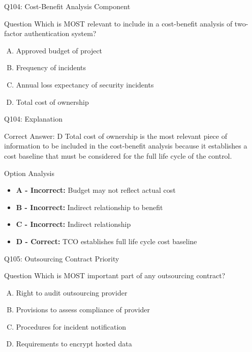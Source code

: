 \documentclass{beamer}
\begin{document}
	\begin{frame}{Q104: Cost-Benefit Analysis Component}
		\begin{block}{Question}
			Which is MOST relevant to include in a cost-benefit analysis of two-factor authentication system?
		\end{block}
		\begin{enumerate}[(A)]
			\item Approved budget of project
			\item Frequency of incidents
			\item Annual loss expectancy of security incidents
			\item Total cost of ownership
		\end{enumerate}
	\end{frame}
	
	\begin{frame}{Q104: Explanation}
		\begin{block}{Correct Answer: D}
			Total cost of ownership is the most relevant piece of information to be included in the cost-benefit analysis because it establishes a cost baseline that must be considered for the full life cycle of the control.
		\end{block}
		\begin{block}{Option Analysis}
			\begin{itemize}
				\item \textbf{A - Incorrect:} Budget may not reflect actual cost
				\item \textbf{B - Incorrect:} Indirect relationship to benefit
				\item \textbf{C - Incorrect:} Indirect relationship
				\item \textbf{D - Correct:} TCO establishes full life cycle cost baseline
			\end{itemize}
		\end{block}
	\end{frame}
	
	\begin{frame}{Q105: Outsourcing Contract Priority}
		\begin{block}{Question}
			Which is MOST important part of any outsourcing contract?
		\end{block}
		\begin{enumerate}[(A)]
			\item Right to audit outsourcing provider
			\item Provisions to assess compliance of provider
			\item Procedures for incident notification
			\item Requirements to encrypt hosted data
		\end{enumerate}
	\end{frame}
	
\end{document}
